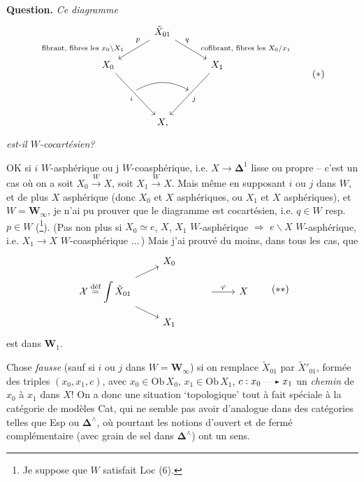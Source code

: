 \textbf{Question.} \textit{Ce diagramme}
\[
\begin{tikzcd}[column sep=small]
 & & \tilde{X}_{01} \arrow[dll, "p"' near start, "\text{fibrant, fibres les $x_0\backslash X_1$}"' near end] \arrow[drr, "q" near start, "\text{cofibrant, fibres les $X_0/x_1$}" near end] & & \\
X_0 \arrow[ddrr, "i"'] & & & & X_1 \arrow[ddll, "j"] \\
 & {} \arrow[rr, bend left] & & {} & \\
 & & X, & &
\end{tikzcd}
\tag*{$(*)$}
\]
\textit{est-il $W$-cocartésien?}

OK si $i$ $W$-asphérique ou j $W$-coasphérique, i.e. $X \longrightarrow \boldsymbol{\Delta}^1$ lisse ou propre -- c'est un cas où on a soit $X_0 \xrightarrow{W} X$, soit $X_1 \xrightarrow{W} X$. Mais même en supposant $i$ ou $j$ dans $W$, et de plus $X$ asphérique (donc $X_0$ et $X$ asphériques, ou $X_1$ et $X$ asphériques), et $W = \mathbf{W}_\infty$, je n'ai pu prouver que le diagramme est cocartésien, i.e. $q \in W$ resp. $p \in W$ (\footnote[9]{Je suppose que $W$ satisfait Loc (6).}). (Pas non plus si $X_0 \simeq e$, $X$, $X_1$ $W$-asphérique $\Longrightarrow$ $e\backslash X$ $W$-asphérique, i.e. $X_1 \longrightarrow X$ $W$-coasphérique $\ldots$\,) Mais j'ai prouvé du moins, dans tous les cas, que %
\[
\begin{tikzcd}[row sep=small]
 & X_0 & & \\
\mathcal{X} \overset{\text{déf}}{=} \displaystyle\int \tilde{X}_{01} \arrow[ur] \arrow[dr] & & {} \arrow[r, "\varphi"] & X \\
 & X_1 & &
\end{tikzcd}
\tag*{$(**)$} %
\]
est dans $\mathbf{W}_1$.

Chose \textit{fausse} (sauf si $i$ ou $j$ dans $W = \mathbf{W}_\infty$) si on remplace $\tilde{X}_{01}$ par $\tilde{X}'_{01}$, formée des triples $(x_0, x_1, c)$, avec $x_0 \in \mathrm{Ob}\,X_0$, $x_1 \in \mathrm{Ob}\,X_1$, $c : x_0 \dotto x_1$ un \textit{chemin} de $x_0$ à $x_1$ dans $X$! On a
donc une situation ‘topologique’ tout à fait spéciale à la catégorie de modèles Cat, qui ne semble pas avoir d'analogue dans des catégories telles que Esp ou $\boldsymbol{\Delta}^\wedge$, où pourtant les notions d'ouvert et de fermé complémentaire (avec grain de sel dans $\boldsymbol{\Delta}^\wedge$) ont un sens.

